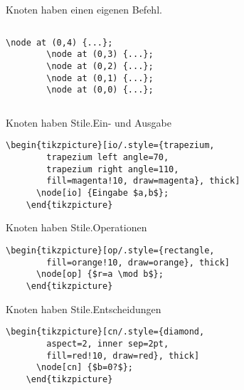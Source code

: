 \begin{Frame}[fragile]{Knoten haben einen eigenen Befehl.}
  \begin{columns}
    \column{30mm}
    \column{58mm}
      \begin{lstlisting}[gobble=8]
        \node at (0,4) {...};
        \node at (0,3) {...};
        \node at (0,2) {...};
        \node at (0,1) {...};
        \node at (0,0) {...};
      \end{lstlisting}
  \end{columns}
\end{Frame}

\begin{Frame}[fragile]{Knoten haben Stile.}{Ein- und Ausgabe}

  \xxx

  \begin{lstlisting}[gobble=4]
    \begin{tikzpicture}[io/.style={trapezium,
        trapezium left angle=70,
        trapezium right angle=110,
        fill=magenta!10, draw=magenta}, thick]
      \node[io] {Eingabe $a,b$};
    \end{tikzpicture}
  \end{lstlisting}
\end{Frame}

\begin{Frame}[fragile]{Knoten haben Stile.}{Operationen}

  \xxx

  \begin{lstlisting}[gobble=4]
    \begin{tikzpicture}[op/.style={rectangle,
        fill=orange!10, draw=orange}, thick]
      \node[op] {$r=a \mod b$};
    \end{tikzpicture}
  \end{lstlisting}
\end{Frame}

\begin{Frame}[fragile]{Knoten haben Stile.}{Entscheidungen}

  \xxx

  \begin{lstlisting}[gobble=4]
    \begin{tikzpicture}[cn/.style={diamond,
        aspect=2, inner sep=2pt,
        fill=red!10, draw=red}, thick]
      \node[cn] {$b=0?$};
    \end{tikzpicture}
  \end{lstlisting}
\end{Frame}

